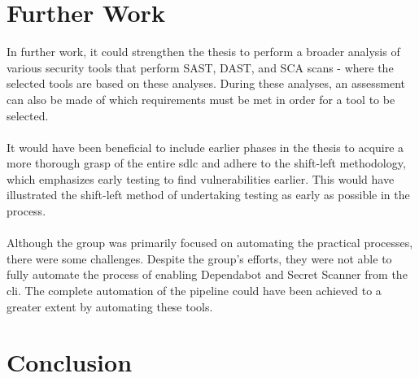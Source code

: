 



\section{Further Work}
In further work, it could strengthen the thesis to perform a broader analysis of various security tools that perform SAST, DAST, and SCA scans -  where the selected tools are based on these analyses. During these analyses, an assessment can also be made of which requirements must be met in order for a tool to be selected. 
\\~\\
It would have been beneficial to include earlier phases in the thesis to acquire a more thorough grasp of the entire \acrlong{sdlc} and adhere to the shift-left methodology, which emphasizes early testing to find vulnerabilities earlier. This would have illustrated the shift-left method of undertaking testing as early as possible in the process.  
\\~\\
Although the group was primarily focused on automating the practical processes, there were some challenges. Despite the group's efforts, they were not able to fully automate the process of enabling Dependabot and Secret Scanner from the \acrshort{cli}. The complete automation of the pipeline could have been achieved to a greater extent by automating these tools. 

\section{Conclusion}
